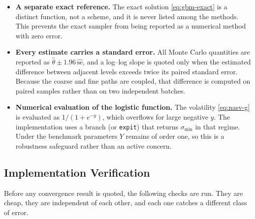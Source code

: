 \documentclass[11pt,a4paper]{article}
\theoremstyle{definition}
\theoremstyle{remark}
\begin{document}
\begin{itemize}
      a silently wrong order.
\item \textbf{A separate exact reference.} The exact solution
      \eqref{eq:gbm-exact} is a distinct function, not a scheme, and it is
      never listed among the methods. This prevents the exact sampler from
      being reported as a numerical method with zero error.
\item \textbf{Every estimate carries a standard error.} All Monte Carlo
      quantities are reported as
      $\hat{\theta} \pm 1.96\, \widehat{\mathrm{se}}$, and a log--log slope is
      quoted only when the estimated difference between adjacent levels exceeds
      twice its paired standard error. Because the coarse and fine paths are
      coupled, that difference is computed on paired samples rather than on two
      independent batches.
\item \textbf{Numerical evaluation of the logistic function.} The volatility
      \eqref{eq:nasv-g} is evaluated as $1/(1 + e^{-y})$, which overflows for
      large negative $y$. The implementation uses a branch (or \texttt{expit})
      that returns $\sigma_{\min}$ in that regime. Under the benchmark
      parameters $Y$ remains of order one, so this is a robustness safeguard
      rather than an active concern.
\end{itemize}

\subsection{Implementation Verification}
\label{sec:impl-verify}

Before any convergence result is quoted, the following checks are run. They are
cheap, they are independent of each other, and each one catches a different
class of error.
\end{document}
